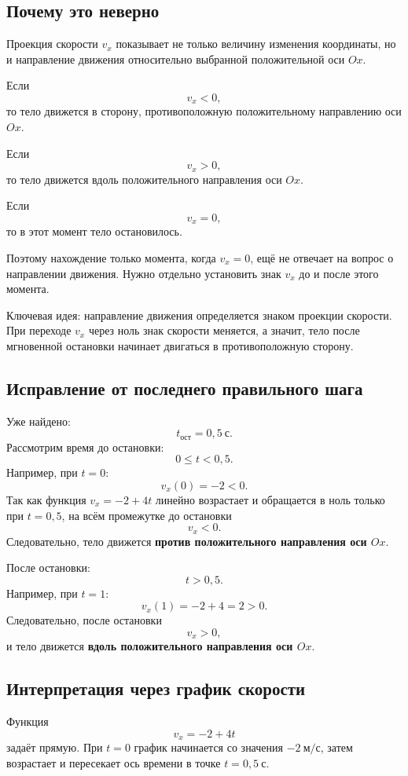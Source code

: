 \documentclass[12pt,a4paper]{article}
\begin{document}
\subsection*{Почему это неверно}
Проекция скорости $v_x$ показывает не только величину изменения координаты, но и направление движения относительно выбранной положительной оси $Ox$.

Если
\[
v_x<0,
\]
то тело движется в сторону, противоположную положительному направлению оси $Ox$.

Если
\[
v_x>0,
\]
то тело движется вдоль положительного направления оси $Ox$.

Если
\[
v_x=0,
\]
то в этот момент тело остановилось.

Поэтому нахождение только момента, когда $v_x=0$, ещё не отвечает на вопрос о направлении движения. Нужно отдельно установить знак $v_x$ до и после этого момента.

\textcolor{blue!60!black}{Ключевая идея:} направление движения определяется знаком проекции скорости. При переходе $v_x$ через ноль знак скорости меняется, а значит, тело после мгновенной остановки начинает двигаться в противоположную сторону.

\subsection*{Исправление от последнего правильного шага}
Уже найдено:
\[
t_{\text{ост}}=0{,}5\ \text{с}.
\]
Рассмотрим время до остановки:
\[
0\le t<0{,}5.
\]
Например, при $t=0$:
\[
v_x(0)=-2<0.
\]
Так как функция $v_x=-2+4t$ линейно возрастает и обращается в ноль только при $t=0{,}5$, на всём промежутке до остановки
\[
v_x<0.
\]
Следовательно, тело движется \textbf{против положительного направления оси $Ox$}.

После остановки:
\[
t>0{,}5.
\]
Например, при $t=1$:
\[
v_x(1)=-2+4=2>0.
\]
Следовательно, после остановки
\[
v_x>0,
\]
и тело движется \textbf{вдоль положительного направления оси $Ox$}.

\subsection*{Интерпретация через график скорости}
Функция
\[
v_x=-2+4t
\]
задаёт прямую. При $t=0$ график начинается со значения $-2\ \text{м/с}$, затем возрастает и пересекает ось времени в точке $t=0{,}5\ \text{с}$.

\begin{center}
\end{center}
\end{document}
